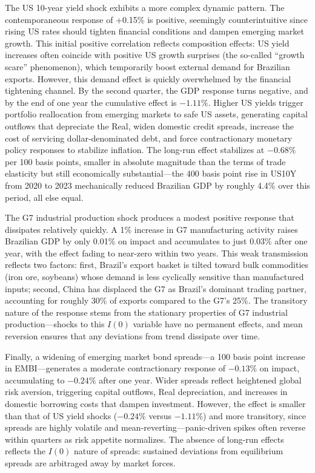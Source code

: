 \documentclass[12pt,a4paper]{article}
\numberwithin{equation}{section}
\theoremstyle{definition}
\theoremstyle{remark}
\begin{document}
The US 10-year yield shock exhibits a more complex dynamic pattern. The contemporaneous response of +0.15\% is positive, seemingly counterintuitive since rising US rates should tighten financial conditions and dampen emerging market growth. This initial positive correlation reflects composition effects: US yield increases often coincide with positive US growth surprises (the so-called ``growth scare'' phenomenon), which temporarily boost external demand for Brazilian exports. However, this demand effect is quickly overwhelmed by the financial tightening channel. By the second quarter, the GDP response turns negative, and by the end of one year the cumulative effect is $-1.11\%$. Higher US yields trigger portfolio reallocation from emerging markets to safe US assets, generating capital outflows that depreciate the Real, widen domestic credit spreads, increase the cost of servicing dollar-denominated debt, and force contractionary monetary policy responses to stabilize inflation. The long-run effect stabilizes at $-0.68\%$ per 100 basis points, smaller in absolute magnitude than the terms of trade elasticity but still economically substantial---the 400 basis point rise in US10Y from 2020 to 2023 mechanically reduced Brazilian GDP by roughly 4.4\% over this period, all else equal.

The G7 industrial production shock produces a modest positive response that dissipates relatively quickly. A 1\% increase in G7 manufacturing activity raises Brazilian GDP by only 0.01\% on impact and accumulates to just 0.03\% after one year, with the effect fading to near-zero within two years. This weak transmission reflects two factors: first, Brazil's export basket is tilted toward bulk commodities (iron ore, soybeans) whose demand is less cyclically sensitive than manufactured inputs; second, China has displaced the G7 as Brazil's dominant trading partner, accounting for roughly 30\% of exports compared to the G7's 25\%. The transitory nature of the response stems from the stationary properties of G7 industrial production---shocks to this $I(0)$ variable have no permanent effects, and mean reversion ensures that any deviations from trend dissipate over time.

Finally, a widening of emerging market bond spreads---a 100 basis point increase in EMBI---generates a moderate contractionary response of $-0.13\%$ on impact, accumulating to $-0.24\%$ after one year. Wider spreads reflect heightened global risk aversion, triggering capital outflows, Real depreciation, and increases in domestic borrowing costs that dampen investment. However, the effect is smaller than that of US yield shocks ($-0.24\%$ versus $-1.11\%$) and more transitory, since spreads are highly volatile and mean-reverting---panic-driven spikes often reverse within quarters as risk appetite normalizes. The absence of long-run effects reflects the $I(0)$ nature of spreads: sustained deviations from equilibrium spreads are arbitraged away by market forces.
\end{document}
